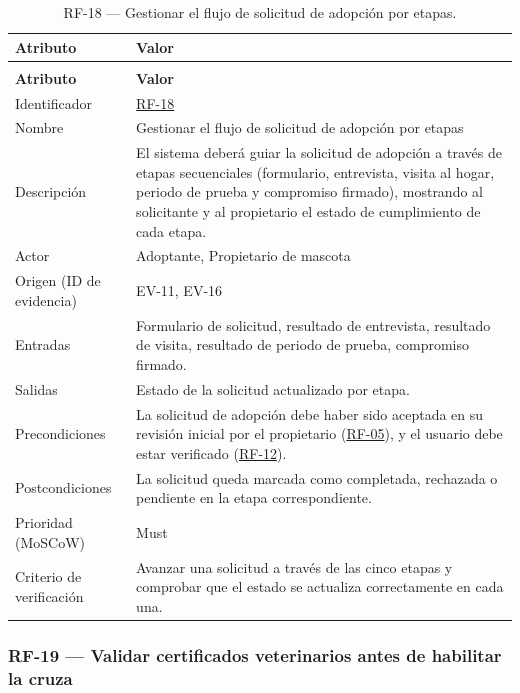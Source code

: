 \documentclass[journal,onecolumn]{IEEEtran}
\makeatletter
\newenvironment{atributos}[2]{%
	\small
	\begin{longtable}{@{}>{\raggedright\arraybackslash}p{4.2cm} >{\raggedright\arraybackslash}p{11.2cm}@{}}
		\caption{#2}\label{tab:#1}\\
		\toprule
		\textbf{Atributo} & \textbf{Valor} \\
		\midrule
		\endfirsthead
		\multicolumn{2}{@{}l}{\small\itshape (continuación)}\\
		\toprule
		\textbf{Atributo} & \textbf{Valor} \\
		\midrule
		\endhead
		\bottomrule
		\endlastfoot
	}{%
	\end{longtable}
	\normalsize
}
\makeatother
\begin{document}
	\begin{atributos}{RF-18}{RF-18 --- Gestionar el flujo de solicitud de adopción por etapas.}
		Identificador & \hyperref[tab:RF-18]{RF-18} \\
		Nombre & Gestionar el flujo de solicitud de adopción por etapas \\
		Descripción & El sistema deberá guiar la solicitud de adopción a través de etapas secuenciales (formulario, entrevista, visita al hogar, periodo de prueba y compromiso firmado), mostrando al solicitante y al propietario el estado de cumplimiento de cada etapa. \\
		Actor & Adoptante, Propietario de mascota \\
		Origen (ID de evidencia) & EV-11, EV-16 \\
		Entradas & Formulario de solicitud, resultado de entrevista, resultado de visita, resultado de periodo de prueba, compromiso firmado. \\
		Salidas & Estado de la solicitud actualizado por etapa. \\
		Precondiciones & La solicitud de adopción debe haber sido aceptada en su revisión inicial por el propietario (\hyperref[tab:RF-05]{RF-05}), y el usuario debe estar verificado (\hyperref[tab:RF-12]{RF-12}). \\
		Postcondiciones & La solicitud queda marcada como completada, rechazada o pendiente en la etapa correspondiente. \\
		Prioridad (MoSCoW) & Must \\
		Criterio de verificación & Avanzar una solicitud a través de las cinco etapas y comprobar que el estado se actualiza correctamente en cada una. \\
	\end{atributos}
	
	\subsubsection{RF-19 --- Validar certificados veterinarios antes de habilitar la cruza}
	
\end{document}
